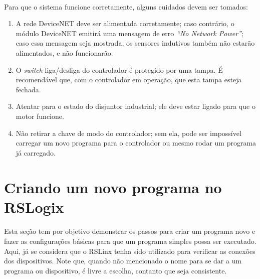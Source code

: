 \documentclass[a4paper,11pt]{scrartcl} %
\numberwithin{equation}{section} %
\numberwithin{figure}{section} %
\numberwithin{table}{section} %
\begin{document}
\paragraph{} Para que o sistema funcione corretamente, alguns cuidados devem ser tomados:
\begin{enumerate}
  \item A rede DeviceNET deve ser alimentada corretamente; caso contrário, o módulo DeviceNET emitirá uma mensagem de erro \textit{``No Network Power''}; caso essa mensagem seja mostrada, os sensores indutivos também não estarão alimentados, e não funcionarão.
  \item O \textit{switch} liga/desliga do controlador é protegido por uma tampa. É recomendável que, com o controlador em operação, que esta tampa esteja fechada.
  \item Atentar para o estado do disjuntor industrial; ele deve estar ligado para que o motor funcione.
  \item Não retirar a chave de modo do controlador; sem ela, pode ser impossível carregar um novo programa para o controlador ou mesmo rodar um programa já carregado.
\end{enumerate}

\section{Criando um novo programa no RSLogix}
\paragraph{} Esta seção tem por objetivo demonstrar os passos para criar um programa novo e fazer as configurações básicas para que um programa simples possa ser executado. Aqui, já se considera que o RSLinx tenha sido utilizado para verificar as conexões dos dispositivos. Note que, quando não mencionado o nome para se dar a um programa ou dispositivo, é livre a escolha, contanto que seja consistente.
\end{document}
